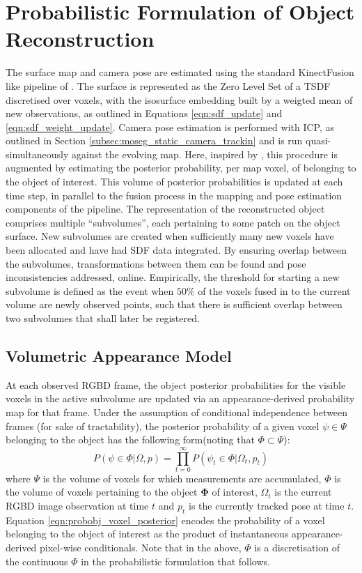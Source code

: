 \section{Probabilistic Formulation of Object Reconstruction}
\label{sec:probobj_prob_formulation}
The surface map and camera pose are estimated using the standard KinectFusion
like pipeline of \cite{Newcombe2011,Prisacariu2014}. The surface is represented
as the Zero Level Set of a TSDF discretised over voxels, with the isosurface 
embedding built by a weigted mean of new observations, as outlined in Equations
\ref{eqn:sdf_update} and \ref{eqn:sdf_weight_update}. Camera pose estimation is
performed with ICP, as outlined in Section \ref{subsec:moseg_static_camera_trackin} 
and is run quasi-simultaneously against the evolving map. Here, inspired by 
\cite{Kolev2006}, this procedure is augmented by estimating the posterior probability, 
per map voxel, of belonging to the object of interest. This volume of posterior 
probabilities is updated at each time step, in parallel to the fusion process in the 
mapping and pose estimation components of the pipeline. The representation of the 
reconstructed object comprises multiple ``subvolumes'', each pertaining to some 
patch on the object surface. New subvolumes are created when sufficiently many new 
voxels have been allocated and have had SDF data integrated. By ensuring overlap
between the subvolumes, transformations between them can be found and pose
inconsistencies addressed, online. Empirically, the threshold for starting a new
subvolume is defined as the event when $50\%$ of the voxels fused in to the
current volume are newly observed points, such that there is sufficient overlap 
between two subvolumes that shall later be registered.

\subsection{Volumetric Appearance Model}
\label{subsec:probobj_vol_appearance_model}
At each observed RGBD frame, the object posterior probabilities for the visible
voxels in the active subvolume are updated via an appearance-derived probability
map for that frame. Under the assumption of conditional independence between
frames (for sake of tractability), the posterior probability of a given voxel
$\psi \in \Psi$ belonging to the object has the following form(noting that
$\Phi \subset \Psi$):
\begin{equation}
\label{eqn:probobj_voxel_posterior}
P(\psi \in \Phi | \Omega, p) = \prod_{t=0}^{\infty}
P(\psi_{t} \in \Phi | \Omega_{t}, p_{t})
\end{equation}
where $\Psi$ is the volume of voxels for which measurements are accumulated,
$\Phi$  is the volume of voxels pertaining to the object $\mathbf{\Phi}$ of 
interest, $\Omega_{t}$ is the current RGBD image observation at time $t$ and 
$p_{t}$ is the currently tracked pose at time $t$. Equation 
\ref{eqn:probobj_voxel_posterior} encodes the probability of a voxel belonging 
to the object of interest as the product of instantaneous appearance-derived 
pixel-wise conditionals. Note that in the above, $\Phi$ is a discretisation of 
the continuous $\Phi$ in the probabilistic formulation that follows.

